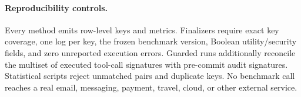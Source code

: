 \paragraph{Reproducibility controls.}
Every method emits row-level keys and metrics. Finalizers require exact key coverage, one log per key, the frozen benchmark version, Boolean utility/security fields, and zero unreported execution errors. Guarded runs additionally reconcile the multiset of executed tool-call signatures with pre-commit audit signatures. Statistical scripts reject unmatched pairs and duplicate keys. No benchmark call reaches a real email, messaging, payment, travel, cloud, or other external service.
